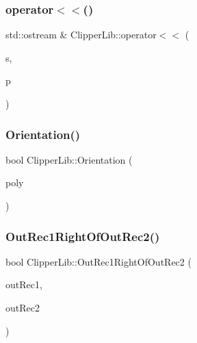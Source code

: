 \mbox{\label{namespace_clipper_lib_aa8b8872f6e4840cb63769a59a88eab4d}} 
\subsubsection{\texorpdfstring{operator$<$$<$()}{operator<<()}\hspace{0.1cm}{\footnotesize\ttfamily [5/5]}}
{\footnotesize\ttfamily std\+::ostream \& Clipper\+Lib\+::operator$<$$<$ (\begin{DoxyParamCaption}\item[{std\+::ostream \&}]{s,  }\item[{const \mbox{\hyperlink{namespace_clipper_lib_a4bab1d9e10805fa6f1fd3b78c56efcfe}{Paths}} \&}]{p }\end{DoxyParamCaption})}

\mbox{\label{namespace_clipper_lib_a806a3d33d76bb9d4479d384f876ce8bd}} 
\subsubsection{\texorpdfstring{Orientation()}{Orientation()}}
{\footnotesize\ttfamily bool Clipper\+Lib\+::\+Orientation (\begin{DoxyParamCaption}\item[{const \mbox{\hyperlink{namespace_clipper_lib_af39c8fe00f278f18cc8142fef41242da}{Path}} \&}]{poly }\end{DoxyParamCaption})}

\mbox{\label{namespace_clipper_lib_ab7e60ff44337799046ac87d22986da2b}} 
\subsubsection{\texorpdfstring{OutRec1RightOfOutRec2()}{OutRec1RightOfOutRec2()}}
{\footnotesize\ttfamily bool Clipper\+Lib\+::\+Out\+Rec1\+Right\+Of\+Out\+Rec2 (\begin{DoxyParamCaption}\item[{\mbox{\hyperlink{struct_clipper_lib_1_1_out_rec}{Out\+Rec}} $\ast$}]{out\+Rec1,  }\item[{\mbox{\hyperlink{struct_clipper_lib_1_1_out_rec}{Out\+Rec}} $\ast$}]{out\+Rec2 }\end{DoxyParamCaption})}

